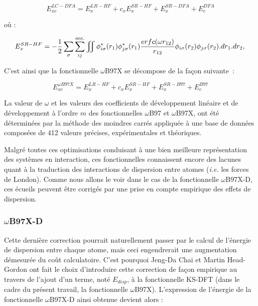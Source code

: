 	\begin{equation}
	E_{xc}^{LC-DFA} = E_{x}^{LR-HF} + c_{x}E_{x}^{SR-HF} + E_{x}^{SR-DFA} + E_{c}^{DFA}
	\end{equation}
	
	\noindent où :
	
	\begin{equation}
	E_{x}^{SR-HF} = -\frac{1}{2} \sum_{\sigma} \sum_{ij}^{occ.} \iint \phi_{i \sigma}^{*}(r_{1}) \phi_{j \sigma}^{*}(r_{1}) \frac{erfc(\omega r_{12})}{r_{12}} \phi_{i \sigma}(r_{2}) \phi_{j \sigma}(r_{2}).dr_{1}.dr_{2}, \\
	\end{equation}
	
	C'est ainsi que la fonctionnelle $\omega$B97X\cite{chai2008long} se décompose de la façon suivante~:
	
	\begin{equation}
	E_{xc}^{\omega B97X} = E_{x}^{LR-HF} + c_{x}E_{x}^{SR-HF} + E_{x}^{SR-B97} + E_{c}^{B97}
	\end{equation}
	
	La valeur de $\omega$ et les valeurs des coefficients de développement linéaire et de développement à l'ordre $m$ des fonctionnelles $\omega$B97 et $\omega$B97X, ont été déterminées par la méthode des moindres carrés appliquée à une base de données composées de 412 valeurs précises, expérimentales et théoriques.
	
	Malgré toutes ces optimisations conduisant à une bien meilleure représentation des systèmes en interaction, ces fonctionnelles connaissent encore des lacunes quant à la traduction des interactions de dispersion entre atomes (\textit{i.e.} les forces de London). Comme nous allons le voir dans le cas de la fonctionnelle $\omega$B97X-D, ces écueils peuvent être corrigés par une prise en compte empirique des effets de dispersion.
	
	\subsubsection{$\omega$B97X-D}
	
	Cette dernière correction pourrait naturellement passer par le calcul de l'énergie de dispersion entre chaque atome, mais ceci engendrerait une augmentation démesurée du coût calculatoire. C'est pourquoi Jeng-Da Chai et Martin Head-Gordon ont fait le choix d'introduire cette correction de façon empirique au travers de l'ajout d'un terme, noté $E_{disp}$, à la fonctionnelle KS-DFT (dans le cadre du présent travail, la fonctionnelle $\omega$B97X). L'expression de l'énergie de la fonctionnelle $\omega$B97X-D \cite{chai2008long} ainsi obtenue devient alors :
	
